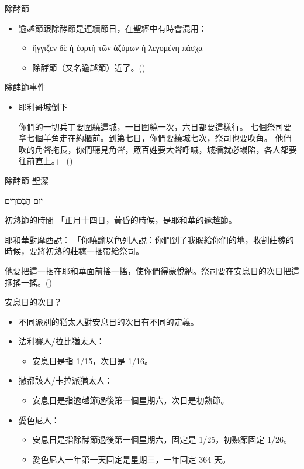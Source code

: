 \documentclass{beamer}
\newcommand{\topic}[1]{
\begin{frame}
    \centering
    \vspace*{1cm}
    {\fontsize{40}{48}\selectfont #1\par}
    \vfill
\end{frame}
}
\newcommand{\conclusion}[2]{
\begin{frame}
    \centering
    \vspace*{1cm}
    {\fontsize{40}{48}\selectfont #1 \textemdash #2\par}
    \vfill
\end{frame}
}
\newcommand{\parvspace}{\par\vspace{0.5em}}
\begin{document}
\begin{frame}{除酵節}
	\begin{itemize}
		\item 逾越節跟除酵節是連續節日，在聖經中有時會混用：
		      \begin{itemize}
			      \item \textgreek{ἤγγιζεν δὲ ἡ \alert{ἑορτὴ τῶν ἀζύμων} ἡ λεγομένη \alert{πάσχα}}\
			      \item 除酵節（又名逾越節）近了。()
		      \end{itemize}
	\end{itemize}
\end{frame}

\begin{frame}{除酵節事件}
	\begin{itemize}
		\item 耶利哥城倒下\par
		      你們的一切兵丁要圍繞這城，一日圍繞一次，六日都要這樣行。 七個祭司要拿七個羊角走在約櫃前。到第七日，你們要繞城七次，祭司也要吹角。 他們吹的角聲拖長，你們聽見角聲，眾百姓要大聲呼喊，城牆就必塌陷，各人都要往前直上。」 ()
	\end{itemize}
\end{frame}

\conclusion{除酵節}{聖潔}

\topic{\texthebrew{יוֹם הַבִּכּוּרִים}}

\begin{frame}{初熟節的時間}
	「正月十四日，黃昏的時候，是耶和華的逾越節。\textellipsis{}\parvspace
	耶和華對摩西說： 「你曉諭以色列人說：你們到了我賜給你們的地，收割莊稼的時候，要將初熟的莊稼一捆帶給祭司。\parvspace
	他要把這一捆在耶和華面前搖一搖，使你們得蒙悅納。祭司要在\alert{安息日的次日}把這捆搖一搖。()\parvspace
\end{frame}

\begin{frame}{安息日的次日？}
	\begin{itemize}
		\item 不同派別的猶太人對安息日的次日有不同的定義。\parencite{TruthShavuot}
		\item 法利賽人/拉比猶太人：
		      \begin{itemize}
			      \item 安息日是指 1/15，次日是 1/16。
		      \end{itemize}
		\item 撒都該人/卡拉派猶太人：
		      \begin{itemize}
			      \item 安息日是指逾越節過後第一個星期六，次日是初熟節。
		      \end{itemize}
		\item 愛色尼人：
		      \begin{itemize}
			      \item 安息日是指除酵節過後第一個星期六，固定是 1/25，初熟節固定 1/26。
			      \item 愛色尼人一年第一天固定是星期三，一年固定 364 天。
		      \end{itemize}
	\end{itemize}
\end{frame}
\end{document}

